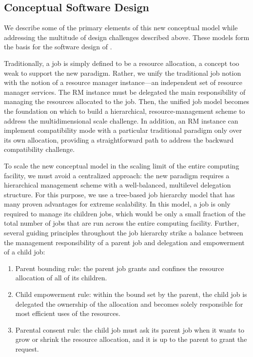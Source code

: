 \subsection{Conceptual Software Design}
We describe some of the primary elements of this new
conceptual model while addressing
the multitude of design challenges described above.
These models form the basis for the software design
of \flux.

\vspace{1ex}
 Traditionally, a job is
simply defined to be a resource allocation, a concept
too weak to support the new paradigm. Rather, we unify
the traditional job notion with the notion of a resource
manager instance---an independent set of resource
manager services. The RM instance must be delegated
the main responsibility of managing the resources allocated
to the job. Then, the unified job model becomes
the foundation on which to build a hierarchical, 
resource-management scheme to address the multidimensional
scale challenge. In addition, an RM instance can
implement compatibility mode with a particular
traditional paradigm only over its own allocation, 
providing a straightforward path to address
the backward compatibility challenge.

\vspace{1ex}
 To scale the new conceptual model
in the scaling limit of the entire computing facility, 
we must avoid a centralized approach: the new paradigm 
requires a hierarchical management scheme with a well-balanced, 
multilevel delegation structure. For this purpose, 
we use a tree-based job hierarchy model that has 
many proven advantages for extreme scalability. 
In this model, a job is only required to manage 
its children jobs, which would be only a small fraction 
of the total number of jobs that are run across 
the entire computing facility. Further, several guiding 
principles throughout the job hierarchy strike 
a balance between the management responsibility 
of a parent job and delegation and empowerment 
of a child job:

\begin{enumerate}
\item{Parent bounding rule: the parent job grants 
and confines the resource allocation of all of its children.}

\item{Child empowerment rule: within the bound set 
by the parent, the child job is delegated the ownership 
of the allocation and becomes solely responsible 
for most efficient uses of the resources.}

\item{Parental consent rule: the child job must ask 
its parent job when it wants to grow or shrink the resource 
allocation, and it is up to the parent to grant the request.}
\end{enumerate}

